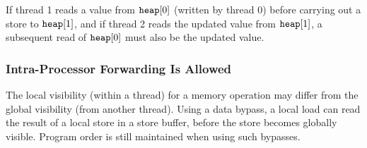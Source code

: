 \begin{table}[!hbt]
\noindent{}
\caption[Stores Are Transitively Visible]{Stores Are Transitively Visible \cite[Example 7]{ref:AMD}}
\label{tbl:litmus:amd:7}
\end{table}

\noindent
If thread 1 reads a value from $\texttt{heap}[0]$ (written by thread 0) before carrying out a store to $\texttt{heap}[1]$, and if thread 2 reads the updated value from $\texttt{heap}[1]$, a subsequent read of $\texttt{heap}[0]$ must also be the updated value.

\subsubsection*{Intra-Processor Forwarding Is Allowed}

The local visibility (within a thread) for a memory operation may differ from the global visibility (from another thread).
Using a data bypass, a local load can read the result of a local store in a store buffer, before the store becomes globally visible.
Program order is still maintained when using such bypasses.

